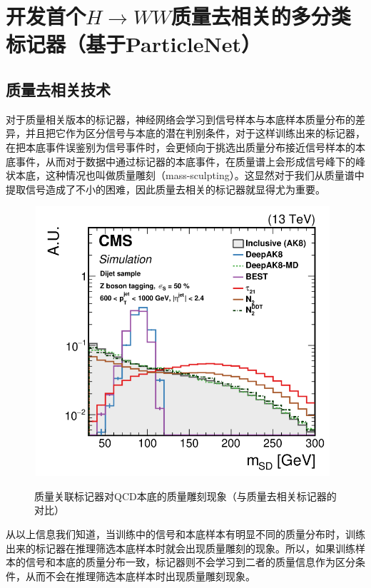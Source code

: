 \chapter{开发首个$H\to WW$质量去相关的多分类标记器（基于ParticleNet）}
\label{chap5}
\fontsize{12bp}{14.4pt}

\section{质量去相关技术}
对于质量相关版本的标记器，神经网络会学习到信号样本与本底样本质量分布的差异，并且把它作为区分信号与本底的潜在判别条件，对于这样训练出来的标记器，在把本底事件误鉴别为信号事件时，会更倾向于挑选出质量分布接近信号样本的本底事件，从而对于数据中通过标记器的本底事件，在质量谱上会形成信号峰下的峰状本底，这种情况也叫做质量雕刻（mass-sculpting）。这显然对于我们从质量谱中提取信号造成了不小的困难，因此质量去相关的标记器就显得尤为重要。

\begin{figure}[H]
 \centering
 \caption{质量关联标记器对QCD本底的质量雕刻现象（与质量去相关标记器的对比）}
 \includegraphics[height=10cm, width=11cm]{pictures/nonMDtagger.png}
 \label{fig:5.1}
\end{figure}


从以上信息我们知道，当训练中的信号和本底样本有明显不同的质量分布时，训练出来的标记器在推理筛选本底样本时就会出现质量雕刻的现象。所以，如果训练样本的信号和本底的质量分布一致，标记器则不会学习到二者的质量信息作为区分条件，从而不会在推理筛选本底样本时出现质量雕刻现象。

